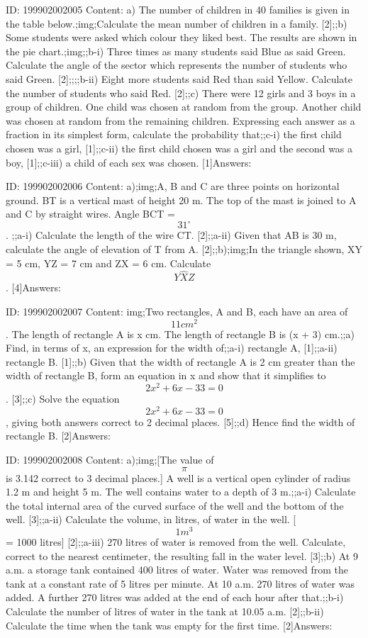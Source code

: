 \documentclass{article}
\begin{document}
ID: 199902002005
Content:
a) The number of children in 40 families is given in the table below.;img;Calculate the mean number of children in a family. [2];;b) Some students were asked which colour they liked best. The results are shown in the pie chart.;img;;b-i) Three times as many students said Blue as said Green. Calculate the angle of the sector which represents the number of students who said Green. [2];;;;b-ii) Eight more students said Red than said Yellow. Calculate the number of students who said Red. [2];;c) There were 12 girls and 3 boys in a group of children. One child was chosen at random from the group. Another child was chosen at random from the remaining children. Expressing each answer as a fraction in its simplest form, calculate the probability that;;c-i) the first child chosen was a girl, [1];;c-ii) the first child chosen was a girl and the second was a boy, [1];;c-iii) a child of each sex was chosen. [1]Answers:

ID: 199902002006
Content:
a);img;A, B and C are three points on horizontal ground. BT is a vertical mast of height 20 m. The top of the mast is joined to A and C by straight wires. Angle BCT = $$31^{\circ}$$. ;;a-i) Calculate the length of the wire CT. [2];;a-ii) Given that AB is 30 m, calculate the angle of elevation of T from A. [2];;b);img;In the triangle shown, XY = 5 cm, YZ = 7 cm and ZX = 6 cm. Calculate $$Y \hat XZ$$. [4]Answers:

ID: 199902002007
Content:
img;Two rectangles, A and B, each have an area of $$11cm^{2} $$. The length of rectangle A is x cm. The length of rectangle B is (x + 3) cm.;;a) Find, in terms of x, an expression for the width of;;a-i) rectangle A, [1];;a-ii) rectangle B. [1];;b) Given that the width of rectangle A is 2 cm greater than the width of rectangle B, form an equation in x and show that it simplifies to $$2x^{2} +6x-33=0$$. [3];;c) Solve the equation $$2x^{2} +6x-33=0$$, giving both answers correct to 2 decimal places. [5];;d) Hence find the width of rectangle B. [2]Answers:

ID: 199902002008
Content:
a);img;[The value of $$\pi$$ is 3.142 correct to 3 decimal places.] A well is a vertical open cylinder of radius 1.2 m and height 5 m. The well contains water to a depth of 3 m.;;a-i) Calculate the total internal area of the curved surface of the well and the bottom of the well. [3];;a-ii) Calculate the volume, in litres, of water in the well. [$$1m^{3} $$ = 1000 litres] [2];;a-iii) 270 litres of water is removed from the well. Calculate, correct to the nearest centimeter, the resulting fall in the water level. [3];;b) At 9 a.m. a storage tank contained 400 litres of water. Water was removed from the tank at a constant rate of 5 litres per minute. At 10 a.m. 270 litres of water was added. A further 270 litres was added at the end of each hour after that.;;b-i) Calculate the number of litres of water in the tank at 10.05 a.m. [2];;b-ii) Calculate the time when the tank was empty for the first time. [2]Answers:
\end{document}
